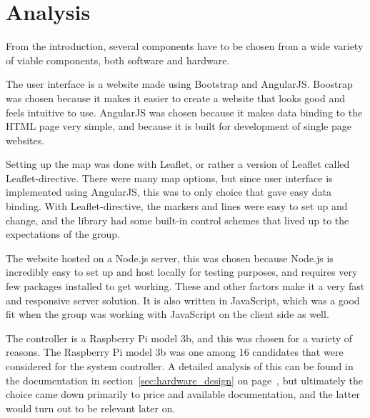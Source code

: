 \chapter{Analysis}

From the introduction, several components have to be chosen from a wide variety of viable components, both software and hardware.

The user interface is a website made using Bootstrap\cite{bootstrap} and AngularJS\cite{angular}. 
Boostrap was chosen because it makes it easier to create a website that looks good and feels intuitive to use.
AngularJS was chosen because it makes data binding to the HTML page very simple, and because it is built for development of single page websites.

Setting up the map was done with Leaflet, or rather a version of Leaflet called Leaflet-directive\cite{leaflet}. There were many map options, but since user interface is implemented using AngularJS, this was to only choice that gave easy data binding. With Leaflet-directive, the markers and lines were easy to set up and change, and the library had some built-in control schemes that lived up to the expectations of the group.

The website hosted on a Node.js server\cite{nodejs}, this was chosen because Node.js is incredibly easy to set up and host locally for testing purposes, and requires very few packages installed to get working. These and other factors make it a very fast and responsive server solution\cite{NodeJS_fast}. It is also written in JavaScript, which was a good fit when the group was working with JavaScript on the client side as well.

The controller is a Raspberry Pi model 3b, and this was chosen for a variety of reasons. The Raspberry Pi model 3b was one among 16 candidates that were considered for the system controller. A detailed analysis of this can be found in the documentation in section~\ref{sec:hardware_design} on page~\pageref{sec:hardware_design}, but ultimately the choice came down primarily to price and available documentation, and the latter would turn out to be relevant later on.

